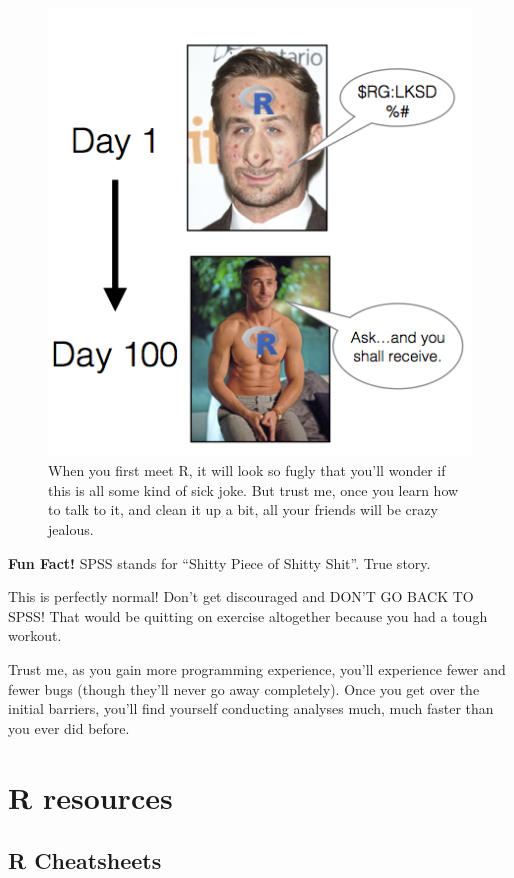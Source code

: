 \documentclass[]{book}
\theoremstyle{definition}
\theoremstyle{definition}
\theoremstyle{remark}
\begin{document}
\begin{figure}

{\centering \includegraphics{images/gosling} 

}

\caption{When you first meet R, it will look so fugly that you'll wonder if this is all some kind of sick joke. But trust me, once you learn how to talk to it, and clean it up a bit, all your friends will be crazy jealous.}\label{fig:unnamed-chunk-5}
\end{figure}

\textbf{Fun Fact!} SPSS stands for ``Shitty Piece of Shitty Shit''. True
story.

This is perfectly normal! Don't get discouraged and DON'T GO BACK TO
SPSS! That would be quitting on exercise altogether because you had a
tough workout.

Trust me, as you gain more programming experience, you'll experience
fewer and fewer bugs (though they'll never go away completely). Once you
get over the initial barriers, you'll find yourself conducting analyses
much, much faster than you ever did before.

\section{R resources}\label{r-resources}

\subsection{R Cheatsheets}\label{r-cheatsheets}
\end{document}
